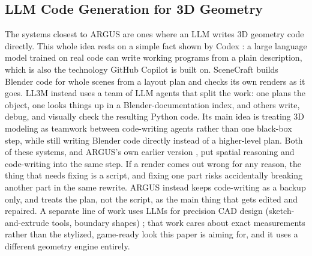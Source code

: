 \documentclass[conference]{IEEEtran}
\begin{document}
\subsection{LLM Code Generation for 3D Geometry}
The systems closest to ARGUS are ones where an LLM writes 3D geometry code directly. This whole idea rests on a simple fact shown by Codex \cite{chen2021codex}: a large language model trained on real code can write working programs from a plain description, which is also the technology GitHub Copilot is built on. SceneCraft \cite{yang2024scenecraft} builds Blender code for whole scenes from a layout plan and checks its own renders as it goes. LL3M \cite{lu2025ll3m} instead uses a team of LLM agents that split the work: one plans the object, one looks things up in a Blender-documentation index, and others write, debug, and visually check the resulting Python code. Its main idea is treating 3D modeling as teamwork between code-writing agents rather than one black-box step, while still writing Blender code directly instead of a higher-level plan. Both of these systems, and ARGUS's own earlier version \cite{dahal2026thesis}, put spatial reasoning and code-writing into the same step. If a render comes out wrong for any reason, the thing that needs fixing is a script, and fixing one part risks accidentally breaking another part in the same rewrite. ARGUS instead keeps code-writing as a backup only, and treats the plan, not the script, as the main thing that gets edited and repaired. A separate line of work uses LLMs for precision CAD design (sketch-and-extrude tools, boundary shapes) \cite{cadsurvey2025}; that work cares about exact measurements rather than the stylized, game-ready look this paper is aiming for, and it uses a different geometry engine entirely.
\end{document}
